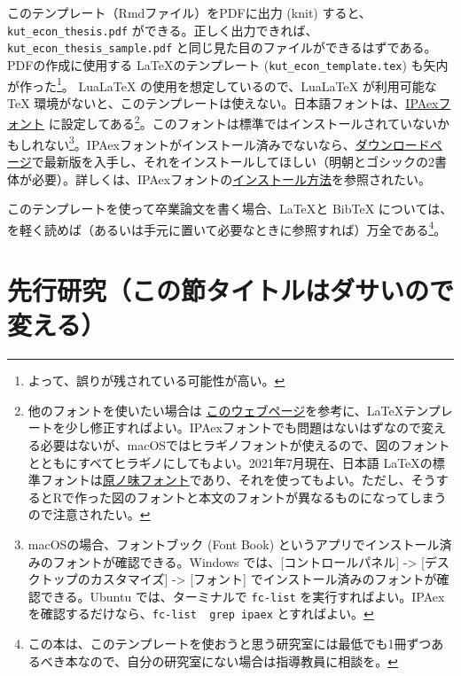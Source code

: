 \documentclass[lualatex,
               a4paper,
               10.5pt,
               ja=standard,
               jafont=ipaex]{bxjsarticle}
\begin{document}
このテンプレート（Rmdファイル）をPDFに出力 (knit) すると、\texttt{kut\_econ\_thesis.pdf} ができる。正しく出力できれば、\texttt{kut\_econ\_thesis\_sample.pdf} と同じ見た目のファイルができるはずである。PDFの作成に使用する \LaTeX  のテンプレート (\texttt{kut\_econ\_template.tex}) も矢内が作った\footnote{よって、誤りが残されている可能性が高い。}。 LuaLaTeX の使用を想定しているので、LuaLaTeX が利用可能な TeX 環境がないと、このテンプレートは使えない。日本語フォントは、\href{https://moji.or.jp/ipafont/}{IPAexフォント} に設定してある\footnote{他のフォントを使いたい場合は \href{https://ja.osdn.net/projects/luatex-ja/wiki/LuaTeX-ja\%E3\%81\%AE\%E4\%BD\%BF\%E3\%81\%84\%E6\%96\%B9}{このウェブページ}を参考に、\LaTeX テンプレートを少し修正すればよい。IPAexフォントでも問題はないはずなので変える必要はないが、macOSではヒラギノフォントが使えるので、図のフォントとともにすべてヒラギノにしてもよい。2021年7月現在、日本語 \LaTeX  の標準フォントは\href{https://texwiki.texjp.org/?\%E5\%8E\%9F\%E3\%83\%8E\%E5\%91\%B3\%E3\%83\%95\%E3\%82\%A9\%E3\%83\%B3\%E3\%83\%88}{原ノ味フォント}であり、それを使ってもよい。ただし、そうするとRで作った図のフォントと本文のフォントが異なるものになってしまうので注意されたい。}。このフォントは標準ではインストールされていないかもしれない\footnote{macOSの場合、フォントブック (Font Book) というアプリでインストール済みのフォントが確認できる。Windows では、{[}コントロールパネル{]} -\textgreater{} {[}デスクトップのカスタマイズ{]} -\textgreater{} {[}フォント{]} でインストール済みのフォントが確認できる。Ubuntu では、ターミナルで \texttt{fc-list} を実行すればよい。IPAex を確認するだけなら、\texttt{fc-list\ \textbar{}\ grep\ ipaex} とすればよい。}。IPAexフォントがインストール済みでないなら、\href{https://moji.or.jp/ipafont/ipafontdownload/}{ダウンロードページ}で最新版を入手し、それをインストールしてほしい（明朝とゴシックの2書体が必要）。詳しくは、IPAexフォントの\href{https://moji.or.jp/ipafont/installation/}{インストール方法}を参照されたい。

このテンプレートを使って卒業論文を書く場合、\LaTeX  と BibTeX については、\citet{okumura2020} を軽く読めば（あるいは手元に置いて必要なときに参照すれば）万全である\footnote{この本は、このテンプレートを使おうと思う研究室には最低でも1冊ずつあるべき本なので、自分の研究室にない場合は指導教員に相談を。}。

\section{先行研究（この節タイトルはダサいので変える）}\label{ux5148ux884cux7814ux7a76ux3053ux306eux7bc0ux30bfux30a4ux30c8ux30ebux306fux30c0ux30b5ux3044ux306eux3067ux5909ux3048ux308b}
\end{document}
